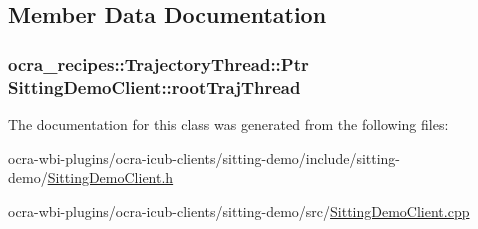 \subsection{\-Member \-Data \-Documentation}
\hypertarget{classSittingDemoClient_a1d5616269e9a673022542bb86f380bfd}{
\subsubsection[{root\-Traj\-Thread}]{\setlength{\rightskip}{0pt plus 5cm}ocra\-\_\-recipes\-::\-Trajectory\-Thread\-::\-Ptr {\bf \-Sitting\-Demo\-Client\-::root\-Traj\-Thread}}}\label{classSittingDemoClient_a1d5616269e9a673022542bb86f380bfd}


\-The documentation for this class was generated from the following files\-:\begin{DoxyCompactItemize}
\item 
ocra-\/wbi-\/plugins/ocra-\/icub-\/clients/sitting-\/demo/include/sitting-\/demo/\hyperlink{SittingDemoClient_8h}{\-Sitting\-Demo\-Client.\-h}\item 
ocra-\/wbi-\/plugins/ocra-\/icub-\/clients/sitting-\/demo/src/\hyperlink{SittingDemoClient_8cpp}{\-Sitting\-Demo\-Client.\-cpp}\end{DoxyCompactItemize}
